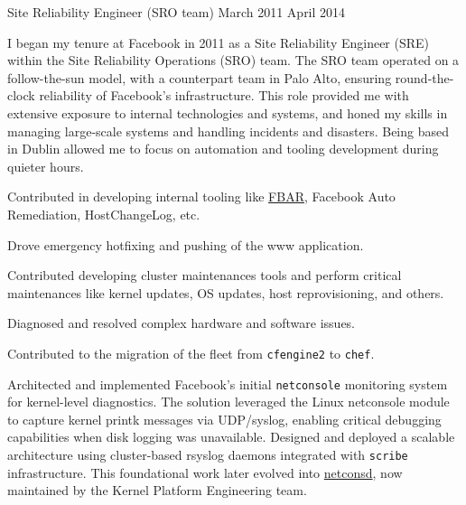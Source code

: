 \begin{cventries}
  \cventryprevrole
  {Site Reliability Engineer (SRO team)}
  {
    March 2011 \newline April 2014
  }
  {
    I began my tenure at Facebook in 2011 as a Site Reliability Engineer (SRE) within the Site Reliability Operations (SRO) team. The SRO team operated on a follow-the-sun model, with a counterpart team in Palo Alto, ensuring round-the-clock reliability of Facebook's infrastructure. This role provided me with extensive exposure to internal technologies and systems, and honed my skills in managing large-scale systems and handling incidents and disasters. Being based in Dublin allowed me to focus on automation and tooling development during quieter hours.
    \vspace{2mm}
    \begin{cvitems}
      \item {Contributed in developing internal tooling like \href{https://engineering.fb.com/2011/09/15/data-center-engineering/making-facebook-self-healing/}{FBAR}, Facebook Auto Remediation, HostChangeLog, etc.}
      \item {Drove emergency hotfixing and pushing of the www application.}
      \item {Contributed developing cluster maintenances tools and perform critical maintenances like kernel updates, OS updates, host reprovisioning, and others.}
      \item {Diagnosed and resolved complex hardware and software issues.}
      \item {Contributed to the migration of the fleet from \texttt{cfengine2} to \texttt{chef}.}
      \item {Architected and implemented Facebook's initial \texttt{netconsole} monitoring system for kernel-level diagnostics.
                  The solution leveraged the Linux netconsole module to capture kernel printk messages via UDP/syslog, enabling critical
                  debugging capabilities when disk logging was unavailable. Designed and deployed a scalable architecture using
                  cluster-based rsyslog daemons integrated with \texttt{scribe} infrastructure. This foundational work later evolved
                  into \href{https://github.com/facebook/netconsd}{netconsd}, now maintained by the Kernel Platform Engineering team.}
    \end{cvitems}
  }


\end{cventries}
